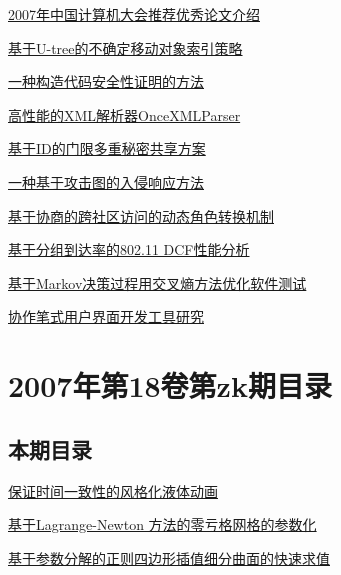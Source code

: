 \documentclass[a4paper]{article}
\begin{document}
\href{http://www.jos.org.cn/ch/reader/download_pdf.aspx?file_no=20081020&year_id=2008&quarter_id=10&falg=1}{2007年中国计算机大会推荐优秀论文介绍}

\href{http://www.jos.org.cn/ch/reader/download_pdf.aspx?file_no=20081021&year_id=2008&quarter_id=10&falg=1}{基于U-tree的不确定移动对象索引策略}

\href{http://www.jos.org.cn/ch/reader/download_pdf.aspx?file_no=20081023&year_id=2008&quarter_id=10&falg=1}{一种构造代码安全性证明的方法}

\href{http://www.jos.org.cn/ch/reader/download_pdf.aspx?file_no=20081024&year_id=2008&quarter_id=10&falg=1}{高性能的XML解析器OnceXMLParser}

\href{http://www.jos.org.cn/ch/reader/download_pdf.aspx?file_no=20081025&year_id=2008&quarter_id=10&falg=1}{基于ID的门限多重秘密共享方案}

\href{http://www.jos.org.cn/ch/reader/download_pdf.aspx?file_no=20081026&year_id=2008&quarter_id=10&falg=1}{一种基于攻击图的入侵响应方法}

\href{http://www.jos.org.cn/ch/reader/download_pdf.aspx?file_no=20081027&year_id=2008&quarter_id=10&falg=1}{基于协商的跨社区访问的动态角色转换机制}

\href{http://www.jos.org.cn/ch/reader/download_pdf.aspx?file_no=20081028&year_id=2008&quarter_id=10&falg=1}{基于分组到达率的802.11 DCF性能分析}

\href{http://www.jos.org.cn/ch/reader/download_pdf.aspx?file_no=20081029&year_id=2008&quarter_id=10&falg=1}{基于Markov决策过程用交叉熵方法优化软件测试}

\href{http://www.jos.org.cn/ch/reader/download_pdf.aspx?file_no=20081030&year_id=2008&quarter_id=10&falg=1}{协作笔式用户界面开发工具研究}


\section{\textbf{2007年第18卷第zk期目录}}
\subsection{本期目录}
\href{http://www.jos.org.cn/ch/reader/download_pdf.aspx?file_no=2007s101&year_id=2007&quarter_id=zk&falg=1}{保证时间一致性的风格化液体动画}

\href{http://www.jos.org.cn/ch/reader/download_pdf.aspx?file_no=2007s102&year_id=2007&quarter_id=zk&falg=1}{基于Lagrange-Newton 方法的零亏格网格的参数化}

\href{http://www.jos.org.cn/ch/reader/download_pdf.aspx?file_no=2007s103&year_id=2007&quarter_id=zk&falg=1}{基于参数分解的正则四边形插值细分曲面的快速求值}
\end{document}
